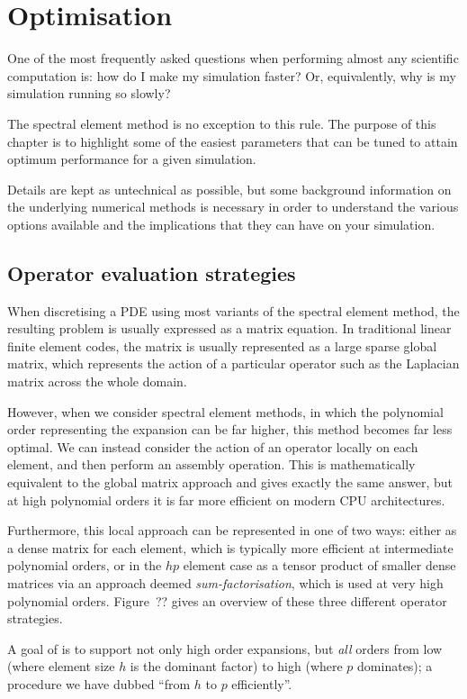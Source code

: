 \chapter{Optimisation}

One of the most frequently asked questions when performing almost any scientific
computation is: how do I make my simulation faster? Or, equivalently, why is my
simulation running so slowly?

The spectral element method is no exception to this rule. The purpose of this
chapter is to highlight some of the easiest parameters that can be tuned to
attain optimum performance for a given simulation.

Details are kept as untechnical as possible, but some background information on
the underlying numerical methods is necessary in order to understand the various
options available and the implications that they can have on your simulation.

\section{Operator evaluation strategies}

When discretising a PDE using most variants of the spectral element method, the
resulting problem is usually expressed as a matrix equation. In traditional
linear finite element codes, the matrix is usually represented as a large sparse
global matrix, which represents the action of a particular operator such as the
Laplacian matrix across the whole domain.

However, when we consider spectral element methods, in which the polynomial
order representing the expansion can be far higher, this method becomes far less
optimal. We can instead consider the action of an operator locally on each
element, and then perform an assembly operation. This is mathematically
equivalent to the global matrix approach and gives exactly the same answer, but
at high polynomial orders it is far more efficient on modern CPU architectures.

Furthermore, this local approach can be represented in one of two ways: either
as a dense matrix for each element, which is typically more efficient at
intermediate polynomial orders, or in the $hp$ element case as a tensor product
of smaller dense matrices via an approach deemed \emph{sum-factorisation}, which
is used at very high polynomial orders. Figure~?? gives an overview of these
three different operator strategies.

A goal of \nekpp is to support not only high order expansions, but \emph{all}
orders from low (where element size $h$ is the dominant factor) to high (where
$p$ dominates); a procedure we have dubbed ``from $h$ to $p$ efficiently''.

